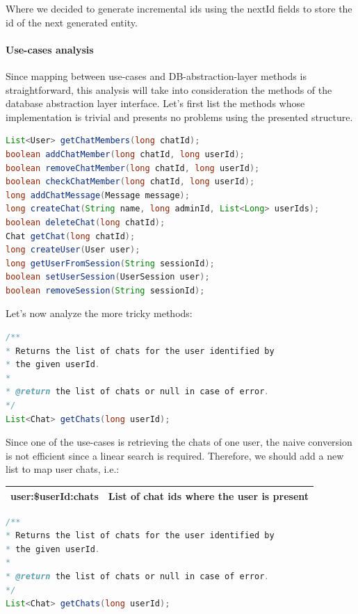 \documentclass[10pt]{article}
\begin{document}
Where we decided to generate incremental ids using the nextId fields to store 
the id of the next generated entity.

\paragraph{Use-cases analysis}
Since mapping between use-cases and DB-abstraction-layer methods is 
straightforward, this analysis will take into consideration the 
methods of the database abstraction layer interface. Let's first list the 
methods whose implementation is trivial and presents no problems using the
presented structure.

\begin{lstlisting}[language = Java]
List<User> getChatMembers(long chatId);
boolean addChatMember(long chatId, long userId);
boolean removeChatMember(long chatId, long userId);
boolean checkChatMember(long chatId, long userId);
long addChatMessage(Message message);
long createChat(String name, long adminId, List<Long> userIds);
boolean deleteChat(long chatId);
Chat getChat(long chatId);
long createUser(User user);
long getUserFromSession(String sessionId);
boolean setUserSession(UserSession user);
boolean removeSession(String sessionId);
\end{lstlisting}

Let's now analyze the more tricky methods:

\begin{lstlisting}[language = Java]
/**
* Returns the list of chats for the user identified by 
* the given userId.
*
* @return the list of chats or null in case of error.
*/
List<Chat> getChats(long userId);
\end{lstlisting}

Since one of the use-cases is retrieving the chats of one user, the naive
conversion is not efficient since a linear search is required.
Therefore, we should add a new list to map user chats, i.e.:

\begin{center}
    \begin{tabular}{ | c | c | }
        \hline
        user:\$userId:chats & List of chat ids where the user is present \\\hline
    \end{tabular}
\end{center}

\begin{lstlisting}[language = Java]
/**
* Returns the list of chats for the user identified by 
* the given userId.
*
* @return the list of chats or null in case of error.
*/
List<Chat> getChats(long userId);
\end{lstlisting}
\end{document}
